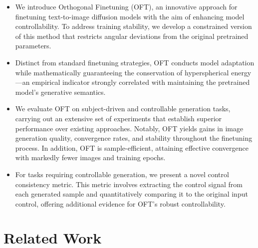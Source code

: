 \begin{itemize}[leftmargin=*,nosep]

    \item We introduce Orthogonal Finetuning (OFT), an innovative approach for finetuning text-to-image diffusion models with the aim of enhancing model controllability. To address training stability, we develop a constrained version of this method that restricts angular deviations from the original pretrained parameters.
    \item Distinct from standard finetuning strategies, OFT conducts model adaptation while mathematically guaranteeing the conservation of hyperspherical energy—an empirical indicator strongly correlated with maintaining the pretrained model’s generative semantics.
    \item We evaluate OFT on subject-driven and controllable generation tasks, carrying out an extensive set of experiments that establish superior performance over existing approaches. Notably, OFT yields gains in image generation quality, convergence rates, and stability throughout the finetuning process. In addition, OFT is sample-efficient, attaining effective convergence with markedly fewer images and training epochs.
    \item For tasks requiring controllable generation, we present a novel control consistency metric. This metric involves extracting the control signal from each generated sample and quantitatively comparing it to the original input control, offering additional evidence for OFT's robust controllability.
\end{itemize}

\section{Related Work}


